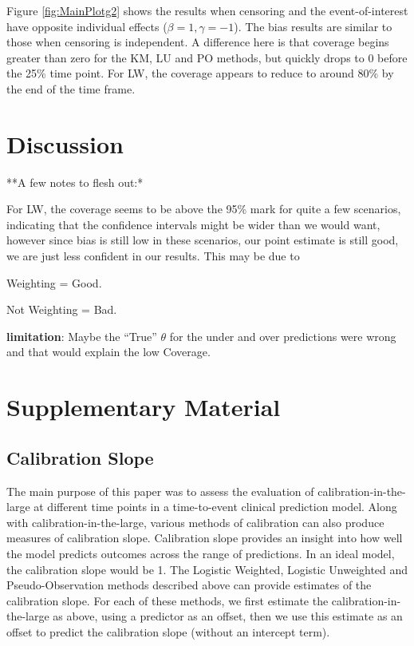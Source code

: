 \documentclass[
]{article}
\begin{document}
Figure \ref{fig:MainPlotg2} shows the results when censoring and the event-of-interest have opposite individual effects (\(\beta=1, \gamma=-1\)). The bias results are similar to those when censoring is independent. A difference here is that coverage begins greater than zero for the KM, LU and PO methods, but quickly drops to 0 before the 25\% time point. For LW, the coverage appears to reduce to around 80\% by the end of the time frame.

\hypertarget{discussion-1}{%
\section{Discussion}\label{discussion-1}}

**A few notes to flesh out:*

For LW, the coverage seems to be above the 95\% mark for quite a few scenarios, indicating that the confidence intervals might be wider than we would want, however since bias is still low in these scenarios, our point estimate is still good, we are just less confident in our results. This may be due to

Weighting = Good.

Not Weighting = Bad.

\textbf{limitation}: Maybe the ``True'' \(\theta\) for the under and over predictions were wrong and that would explain the low Coverage.

\hypertarget{appendix-appendices}{%
\appendix}


\hypertarget{chapIPCWlogisticsupp}{%
\section{Supplementary Material}\label{chapIPCWlogisticsupp}}

\hypertarget{calibration-slope}{%
\subsection{Calibration Slope}\label{calibration-slope}}

The main purpose of this paper was to assess the evaluation of calibration-in-the-large at different time points in a time-to-event clinical prediction model. Along with calibration-in-the-large, various methods of calibration can also produce measures of calibration slope. Calibration slope provides an insight into how well the model predicts outcomes across the range of predictions. In an ideal model, the calibration slope would be 1. The Logistic Weighted, Logistic Unweighted and Pseudo-Observation methods described above can provide estimates of the calibration slope. For each of these methods, we first estimate the calibration-in-the-large as above, using a predictor as an offset, then we use this estimate as an offset to predict the calibration slope (without an intercept term).
\end{document}
